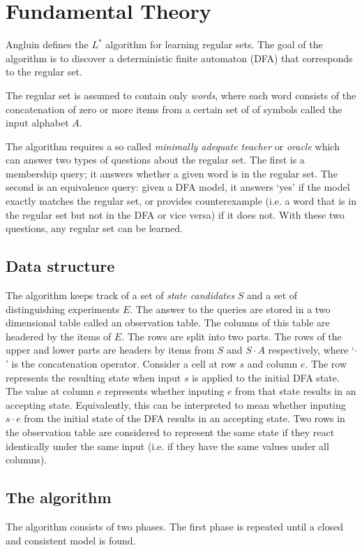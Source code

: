 \documentclass[multi,crop=false,class=article]{standalone}
\newcommand{\concat}{\cdot}
\begin{document}
\section{Fundamental Theory}
\label{sec:fundamental-theory}

Angluin defines the $L^*$ algorithm for learning regular sets. The goal of the
algorithm is to discover a deterministic finite automaton (DFA) that corresponds
to the regular set.

The regular set is assumed to contain only \textit{words}, where each word
consists of the concatenation of zero or more items from a certain set of of
symbols called the input alphabet $A$.

The algorithm requires a so called \textit{minimally adequate teacher} or
\textit{oracle} which can answer two types of questions about the regular set.
The first is a membership query; it answers whether a given word is in the
regular set. The second is an equivalence query: given a DFA model, it answers
`yes' if the model exactly matches the regular set, or provides counterexample
(i.e. a word that is in the regular set but not in the DFA or vice versa) if it
does not. With these two questions, any regular set can be learned.

\subsection {Data structure} The algorithm keeps track of a set of \textit{state
candidates} $S$ and a set of distinguishing experiments  $E$. The answer to the
queries are stored in a two dimensional table called an observation table. The
columns of this table are headered by the items of $E$. The rows are split into
two parts. The rows of the upper and lower parts are headers by items from $S$
and $S \concat A$ respectively, where `$\concat$' is the concatenation operator.
Consider a cell at row $s$ and column $e$. The row represents the resulting
state when input $s$ is applied to the initial DFA state. The value at column
$e$ represents whether inputing $e$ from that state results in an accepting
state. Equivalently, this can be interpreted to mean whether inputing $s \concat
e$ from the initial state of the DFA results in an accepting state. Two rows in
the observation table are considered to represent the same state if they react
identically under the same input (i.e. if they have the same values under all
columns).

\subsection {The algorithm} The algorithm consists of two phases. The first
phase is repeated until a closed and consistent model is found.
\end{document}
